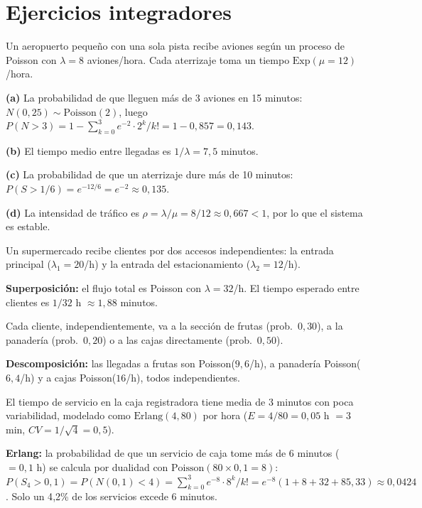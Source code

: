 \documentclass[11pt, letterpaper]{article}
\begin{document}
\section{Ejercicios integradores}

\begin{ejemplo}[Aeropuerto]
Un aeropuerto pequeño con una sola pista recibe aviones según un proceso de Poisson con $\lambda = 8$ aviones/hora. Cada aterrizaje toma un tiempo $\text{Exp}(\mu = 12)$/hora.

\textbf{(a)} La probabilidad de que lleguen más de 3 aviones en 15 minutos: $N(0{,}25) \sim \text{Poisson}(2)$, luego $P(N>3) = 1 - \sum_{k=0}^{3} e^{-2}\cdot 2^k/k! = 1 - 0{,}857 = 0{,}143$.

\textbf{(b)} El tiempo medio entre llegadas es $1/\lambda = 7{,}5$ minutos.

\textbf{(c)} La probabilidad de que un aterrizaje dure más de 10 minutos: $P(S > 1/6) = e^{-12/6} = e^{-2} \approx 0{,}135$.

\textbf{(d)} La intensidad de tráfico es $\rho = \lambda/\mu = 8/12 \approx 0{,}667 < 1$, por lo que el sistema es estable.
\end{ejemplo}

\begin{ejemplo}
Un supermercado recibe clientes por dos accesos independientes: la entrada principal ($\lambda_1 = 20$/h) y la entrada del estacionamiento ($\lambda_2 = 12$/h).

\textbf{Superposición:} el flujo total es Poisson con $\lambda = 32$/h. El tiempo esperado entre clientes es $1/32$ h $\approx 1{,}88$ minutos.

Cada cliente, independientemente, va a la sección de frutas (prob.\ $0{,}30$), a la panadería (prob.\ $0{,}20$) o a las cajas directamente (prob.\ $0{,}50$).

\textbf{Descomposición:} las llegadas a frutas son Poisson($9{,}6$/h), a panadería Poisson($6{,}4$/h) y a cajas Poisson($16$/h), todos independientes.

El tiempo de servicio en la caja registradora tiene media de 3 minutos con poca variabilidad, modelado como $\text{Erlang}(4, 80)$ por hora ($E = 4/80 = 0{,}05$ h $= 3$ min, $CV = 1/\sqrt{4} = 0{,}5$).

\textbf{Erlang:} la probabilidad de que un servicio de caja tome más de 6 minutos ($= 0{,}1$ h) se calcula por dualidad con $\text{Poisson}(80 \times 0{,}1 = 8)$: $P(S_4 > 0{,}1) = P(N(0{,}1) < 4) = \sum_{k=0}^{3} e^{-8}\cdot 8^k/k! = e^{-8}(1+8+32+85{,}33) \approx 0{,}0424$. Solo un 4{,}2\% de los servicios excede 6 minutos.
\end{ejemplo}
\end{document}

